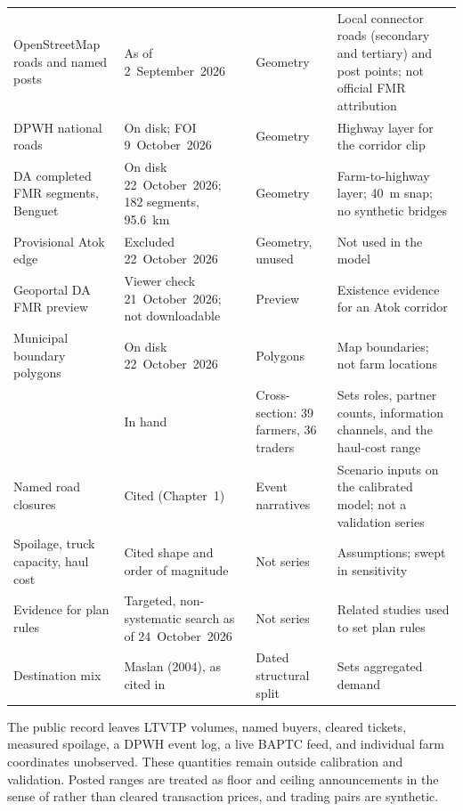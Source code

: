 \documentclass{icsthesis}
\begin{document}
\begin{mainmatter}
\begin{longtable}[l]{@{}>{\raggedright\arraybackslash}p{}>{\raggedright\arraybackslash}p{}>{\raggedright\arraybackslash}p{}>{\raggedright\arraybackslash}p{}@{}}
			OpenStreetMap roads and named posts & As of 2~September~2026 & Geometry & Local connector roads (secondary and tertiary) and post points; not official FMR attribution \\
			DPWH national roads & On disk; FOI 9~October~2026 & Geometry & Highway layer for the corridor clip \\
			DA completed FMR segments, Benguet & On disk 22~October~2026; 182 segments, 95.6~km & Geometry & Farm-to-highway layer; 40~m snap; no synthetic bridges \\
			Provisional Atok edge & Excluded 22~October~2026 & Geometry, unused & Not used in the model \\
			Geoportal DA FMR preview \citep{GeoportalDAFMR2026} & Viewer check 21~October~2026; not downloadable & Preview & Existence evidence for an Atok corridor \\
			Municipal boundary polygons & On disk 22~October~2026 & Polygons & Map boundaries; not farm locations \\
			\citet{deGuzmanBambicoBaconguis2023} & In hand & Cross-section: 39 farmers, 36 traders & Sets roles, partner counts, information channels, and the haul-cost range \\
			Named road closures & Cited (Chapter~1) & Event narratives & Scenario inputs on the calibrated model; not a validation series \\
			Spoilage, truck capacity, haul cost & Cited shape and order of magnitude \citep{Antolin2024,Fernandez2004,Launio2022,deGuzmanBambicoBaconguis2023} & Not series & Assumptions; swept in sensitivity \\
			Evidence for plan rules & Targeted, non-systematic search as of 24~October~2026 \citep{Antolin2024,Fernandez2004,Launio2022,Nurlina2024,Colon2021,Aghaie2019} & Not series & Related studies used to set plan rules \\
			Destination mix & Maslan (2004), as cited in \citet{Fangasan2009} & Dated structural split & Sets aggregated demand \\
			\end{longtable}
			\endgroup

			The public record leaves LTVTP volumes, named buyers, cleared tickets, measured spoilage, a DPWH event log, a live BAPTC feed, and individual farm coordinates unobserved. These quantities remain outside calibration and validation. Posted ranges are treated as floor and ceiling announcements in the sense of \citet{deGuzmanBambicoBaconguis2023} rather than cleared transaction prices, and trading pairs are synthetic.


\end{mainmatter}
\end{document}
